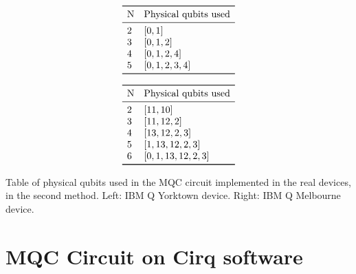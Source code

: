\begin{center}
\begin{table}[h!]
\begin{minipage}[c]{0.5\linewidth}
\hspace{1cm}
\[
\begin{array}{*{2}l}
\toprule
\text{N} 	&	\text{Physical qubits used}	 \\
\midrule
2	&	[0,1]  \\
3	&	[0,1,2] \\
4	&	[0,1,2,4]	 \\
5	&	[0,1,2,3,4]	\\
\bottomrule

\end{array}
\]
\end{minipage}
\begin{minipage}[]{0.5\linewidth}
\[
\begin{array}{*{2}l}
\toprule
\text{N} 	&	\text{Physical qubits used}	 \\
\midrule
2	&	[11,10] \\
3	&	[11,12,2] \\
4	&	[13,12,2,3]	 \\
5	&	[1,13,12,2,3]\\
6	&	[0,1,13,12,2,3]	\\
\bottomrule

\end{array}
\]

\end{minipage}


\caption{ Table of physical qubits used in the MQC circuit implemented in the real devices, in the second method. Left: IBM Q Yorktown device. Right: IBM Q Melbourne device. }
\label{physicalqubits}
\end{table}
\end{center}



\newpage
\section{MQC Circuit on Cirq software }
\label{Cirq_MqcCircuit}

